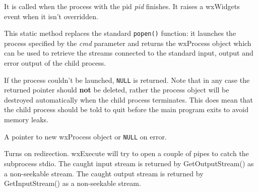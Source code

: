 It is called when the process with the pid {\it pid} finishes.
It raises a wxWidgets event when it isn't overridden.



\label{wxprocessopen}


This static method replaces the standard {\tt popen()} function: it launches
the process specified by the {\it cmd} parameter and returns the wxProcess
object which can be used to retrieve the streams connected to the standard
input, output and error output of the child process.

If the process couldn't be launched, {\tt NULL} is returned. Note that in any
case the returned pointer should {\bf not} be deleted, rather the process
object will be destroyed automatically when the child process terminates. This
does mean that the child process should be told to quit before the main program
exits to avoid memory leaks.




A pointer to new wxProcess object or {\tt NULL} on error.



\label{wxprocessredirect}


Turns on redirection. wxExecute will try to open a couple of pipes
to catch the subprocess stdio. The caught input stream is returned by
GetOutputStream() as a non-seekable stream. The caught output stream is returned
by GetInputStream() as a non-seekable stream.

